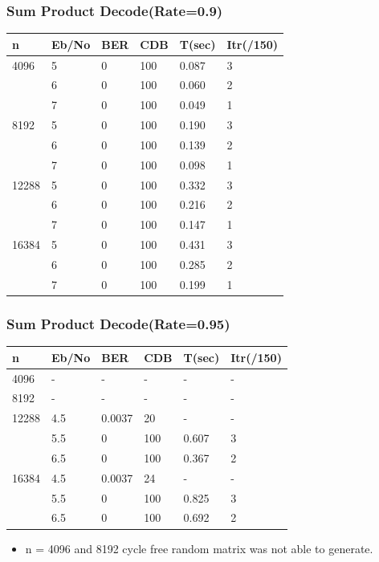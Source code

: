 \documentclass[xcolor=dvipsname]
{beamer}
\begin{document}
\begin{frame}[t] 
\frametitle{Sum Product Decode(Rate=0.9)}
\begin{table}[]
\centering
\begin{tabular}{|l|l|l|l|l|l|}
\hline
n     & Eb/No & BER & CDB & T(sec) & Itr(/150) \\ \hline
4096  & 5     & 0   & 100 & 0.087  & 3         \\ 
      & 6     & 0   & 100 & 0.060  & 2         \\ 
      & 7     & 0   & 100 & 0.049  & 1         \\ \hline
8192  & 5     & 0   & 100 & 0.190  & 3         \\ 
      & 6     & 0   & 100 & 0.139  & 2         \\ 
      & 7     & 0   & 100 & 0.098  & 1         \\ \hline
12288 & 5     & 0   & 100 & 0.332  & 3         \\ 
      & 6     & 0   & 100 & 0.216  & 2         \\ 
      & 7     & 0   & 100 & 0.147  & 1         \\ \hline
16384 & 5     & 0   & 100 & 0.431  & 3         \\ 
      & 6     & 0   & 100 & 0.285  & 2         \\ 
      & 7     & 0   & 100 & 0.199  & 1         \\ \hline
\end{tabular}
\end{table}
\end{frame}


\begin{frame}[t] 
\frametitle{Sum Product Decode(Rate=0.95)}
\begin{table}[]
\centering
\begin{tabular}{|l|l|l|l|l|l|}
\hline
n     & Eb/No & BER    & CDB & T(sec) & Itr(/150) \\ \hline
4096  & -     & -      & -   & -      & -         \\ \hline
8192  & -     & -      & -   & -      & -         \\ \hline
12288 & 4.5   & 0.0037 & 20  & -      & -         \\ 
      & 5.5   & 0      & 100 & 0.607  & 3         \\ 
      & 6.5   & 0      & 100 & 0.367  & 2         \\ \hline
16384 & 4.5   & 0.0037 & 24  & -      & -         \\ 
      & 5.5   & 0      & 100 & 0.825  & 3         \\ 
      & 6.5   & 0      & 100 & 0.692  & 2         \\ \hline
\end{tabular}
\end{table}
\begin{itemize}
\item n = 4096 and 8192 cycle free random matrix was not able to generate. 
\end{itemize}
\end{frame}
\end{document}
